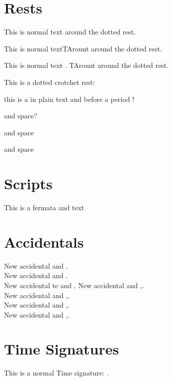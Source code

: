 \documentclass{scrartcl}
\begin{document}
\section*{Rests}

This is normal text  \lilyDot around the dotted rest.

This is normal text\halfNoteRestUp* TArount around the dotted rest.


This is normal text \halfNoteRestUpDotted[scale=3,raise=-2] . TArount around the dotted rest.

This is a dotted crotchet rest: 
\crotchetRestDotted[scale=0.5] 
\crotchetRestDotted[scale=1]
\crotchetRestDotted[scale=1.5]
\crotchetRestDotted[scale=2]
\crotchetRestDotted[scale=3.5]
\crotchetRestDotted[scale=5]

this is a \crotchetRest in plain text and before a period \crotchetRest* !

 and space?

\lilyRFZ and space

 and space

\section*{Scripts}

This is a fermata \fermata* and text

\section*{Accidentals}
New \sharp accidental \sharpArrowdown and \sharpArrowdown*.\\
New \sharp accidental \sharpArrowup and \sharpArrowup*.\\
New \sharp accidental te \sharpArrowboth and \sharpArrowboth*.
New accidental \sharpSlashslashStem and \sharpSlashslashStem*,.\\
New accidental \sharpSlashslashslashStemstem and \sharpSlashslashslashStemstem*,.\\
New accidental \sharpSlashslashslashStem and \sharpSlashslashslashStem*,.\\
New accidental \sharpSlashslashStemstemstem and \sharpSlashslashStemstemstem*,.\\

\section*{Time Signatures}
	This is a normal Time signature: .
	
\end{document}
